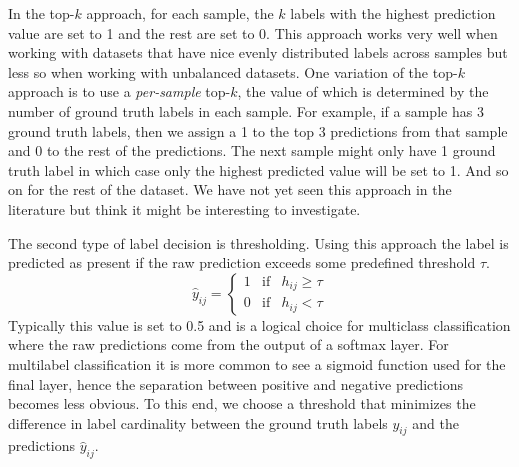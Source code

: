 \documentclass[12pt,journal,compsoc]{IEEEtran}
\begin{document}

In the top-$k$ approach, for each sample, the $k$ labels with the highest prediction value are set to 1 and the rest are set to 0.  This approach works very well when working with datasets that have nice evenly distributed labels across samples but less so when working with unbalanced datasets. One variation of the top-$k$ approach is to use a \textit{per-sample} top-$k$, the value of which is determined by the number of ground truth labels in each sample.  For example, if a sample has 3 ground truth labels, then we assign a 1 to the top 3 predictions from that sample and 0 to the rest of the predictions.  The next sample might only have 1 ground truth label in which case only the highest predicted value will be set to 1.  And so on for the rest of the dataset.  We have not yet seen this approach in the literature but think it might be interesting to investigate.

The second type of label decision is thresholding. Using this approach the label is predicted as present if the raw prediction exceeds some predefined threshold $\tau$. 
\begin{equation}
\hat{y}_{ij} = \left\{
    \begin{array}{lll}
        1 & \mathrm{if} & h_{ij} \geq \tau \\
        0 & \mathrm{if} & h_{ij} < \tau
    \end{array}
\right.
\end{equation}
Typically this value is set to 0.5 and is a logical choice for multiclass classification where the raw predictions come from the output of a softmax layer.  For multilabel classification it is more common to see a sigmoid function used for the final layer, hence the separation between positive and negative predictions becomes less obvious. To this end, we choose a threshold that minimizes the difference in label cardinality between the ground truth labels $y_{ij}$ and the predictions $\hat{y}_{ij}$.~\cite{Read:2011}
\end{document}
